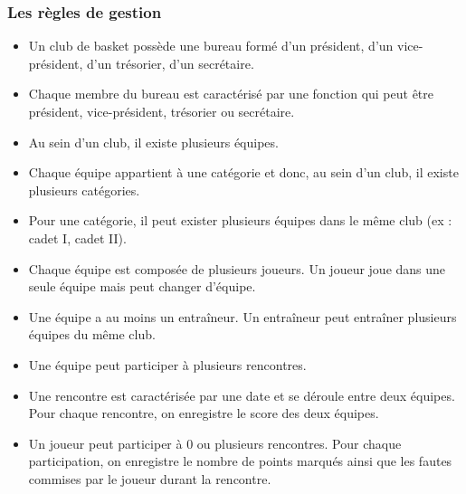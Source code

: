 \documentclass{article}
\begin{document}
\subsubsection*{Les règles de gestion}
\begin{itemize}
\item Un club de basket possède une bureau formé d'un président, d'un vice-président, d'un trésorier, d'un secrétaire.  \\


\item Chaque membre du bureau est caractérisé par une fonction qui peut être président, vice-président, trésorier ou secrétaire. \\


\item Au sein d'un club, il existe plusieurs équipes. \\


\item Chaque équipe appartient à une catégorie et donc, au sein d'un club, il existe plusieurs catégories.  \\


\item Pour une catégorie, il peut exister plusieurs équipes dans le même club (ex : cadet I, cadet II). \\


\item Chaque équipe est composée de plusieurs joueurs. Un joueur joue dans une seule équipe mais peut changer d'équipe. \\


\item Une équipe a au moins un entraîneur. Un entraîneur peut entraîner plusieurs équipes du même club. \\


\item Une équipe peut participer à plusieurs rencontres. \\


\item Une rencontre est caractérisée par une date et se déroule entre deux équipes. Pour chaque rencontre, on enregistre le score des deux équipes. \\


\item Un joueur peut participer à 0 ou plusieurs rencontres. Pour chaque participation, on enregistre le nombre de points marqués ainsi que les fautes commises par le joueur durant la rencontre. \\
\end{itemize}
\end{document}
